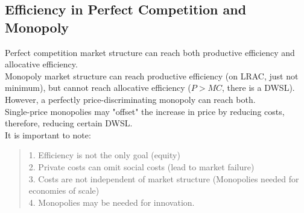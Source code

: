 \subsection{Efficiency in Perfect Competition and Monopoly}
Perfect competition market structure can reach both productive efficiency and allocative efficiency. \\
Monopoly market structure can reach productive efficiency (on LRAC, just not minimum), but cannot reach allocative efficiency ($P > MC$, there is a DWSL). However, a perfectly price-discriminating monopoly can reach both. \\
Single-price monopolies may "offset" the increase in price by reducing costs, therefore, reducing certain DWSL. \\
It is important to note:
\begin{quote}
    1. Efficiency is not the only goal (equity) \\
    2. Private costs can omit social costs (lead to market failure) \\
    3. Costs are not independent of market structure (Monopolies needed for economies of scale) \\
    4. Monopolies may be needed for innovation.
\end{quote}

\newpage